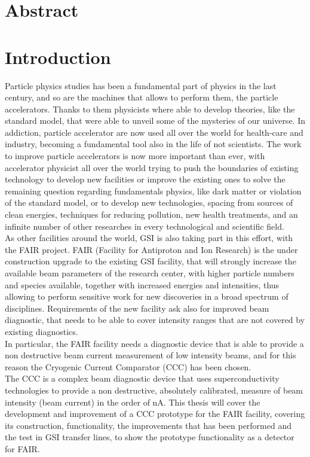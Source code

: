 \documentclass[12pt,a4paper]{report}
\begin{document}
	\chapter*{Abstract}
	
	
	
	\tableofcontents
	
	\chapter{Introduction}
	Particle physics studies has been a fundamental part of physics in the last century, and so are the machines that allows to perform them, the particle accelerators. Thanks to them physicists where able to develop theories, like the standard model, that were able to unveil some of the mysteries of our universe. In addiction, particle accelerator are now used all over the world for health-care and industry, becoming a fundamental tool also in the life of not scientists. The work to improve particle accelerators is now more important than ever, with accelerator physicist all over the world trying to push the boundaries of existing technology to develop new facilities or improve the existing ones to solve the remaining question regarding fundamentals physics, like dark matter or violation of the standard model, or to develop new technologies, spacing from sources of clean energies, techniques for reducing pollution, new health treatments, and an infinite number of other researches in every technological and scientific field. \\
	As other facilities around the world, GSI is also taking part in this effort, with the FAIR project. FAIR (Facility for Antiproton and Ion Research) is the under construction upgrade to the existing GSI facility, that will strongly increase the available beam parameters of the research center, with higher particle numbers and species available, together with increased energies and intensities, thus allowing to perform sensitive work for new discoveries in a broad spectrum of disciplines. Requirements of the new facility ask also for improved beam diagnostic, that needs to be able to cover intensity ranges that are not covered by existing diagnostics.\\
	In particular, the FAIR facility needs a diagnostic device that is able to provide a non destructive beam current measurement of low intensity beams, and for this reason the Cryogenic Current Comparator (CCC) has been chosen.\\
	The CCC is a complex beam diagnostic device that uses superconductivity technologies to provide a non destructive, absolutely calibrated, measure of beam intensity (beam current) in the order of nA. This thesis will cover the development and improvement of a CCC prototype for the FAIR facility, covering its construction, functionality, the improvements that has been performed and the test in GSI transfer lines, to show the prototype functionality as a detector for FAIR. \\
\end{document}
